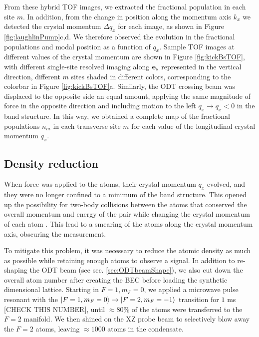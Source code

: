 From these hybrid TOF images, we extracted the fractional population in each site $m$. In addition, from the change in position along the momentum axis $k_x$ we detected the crystal momentum $\Delta q_x$ for each image, as shown in Figure \ref{fig:laughlinPump}c,d.  We therefore observed the evolution in the fractional populations and modal position as a function of $q_x$. Sample TOF images at different values of the crystal momentum are shown in Figure \ref{fig:kickBsTOF}, with different single-site resolved imaging along $\textbf{e}_s{}$ represented in the vertical direction, different $m$ sites shaded in different colors, corresponding to the colorbar in Figure \ref{fig:kickBsTOF}a. Similarly, the ODT crossing beam was displaced to the opposite side an equal amount, applying the same magnitude of force in the opposite direction and including motion to the left  $q_x\rightarrow q_x<0$ in the band structure. In this way, we obtained a complete map of the fractional populations $n_m$ in each transverse site $m$ for each value of the longitudinal crystal momentum $q_x$.

\subsection{Density reduction}
When force was applied to the atoms, their crystal momentum $q_x$ evolved, and they were no longer confined to a minimum of the band structure. This opened up the possibility for two-body collisions between the atoms that conserved the overall momentum and energy of the pair while changing the crystal momentum of each atom \cite{Campbell2006}. This lead to a smearing of the atoms along the crystal momentum axis, obscuring the measurement. 

To mitigate this problem, it was necessary to reduce the atomic density as much as possible while retaining enough atoms to observe a signal. In addition to re-shaping the ODT beam (see sec. \ref{sec:ODTbeamShape}), we also cut down the overall atom number after creating the BEC before loading the synthetic dimensional lattice. Starting in $F=1, m_F=0$, we applied a microwave pulse resonant with the $\mathinner{|{F=1,m_F=0}\rangle}\rightarrow\mathinner{|{F=2,m_F=-1}\rangle}$ transition for $1$ ms [CHECK THIS NUMBER], until $\approx80\%$ of the atoms were transferred to the $F=2$ manifold. We then shined on the XZ probe beam to selectively blow away the $F=2$ atoms, leaving $\approx 1000$ atoms in the condensate.  

